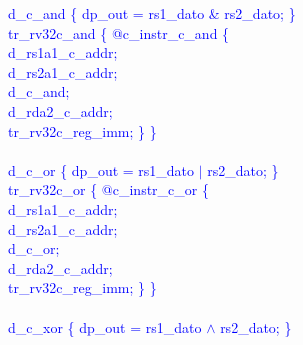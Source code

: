 \textcolor{blue}{
\indent d\_c\_and \{ dp\_out = rs1\_dato \& rs2\_dato; \}\\%
\indent tr\_rv32c\_and \{ @c\_instr\_c\_and \{ \\%
\indent \hspace{\parindent} d\_rs1a1\_c\_addr; \\%
\indent \hspace{\parindent} d\_rs2a1\_c\_addr; \\%
\indent \hspace{\parindent} d\_c\_and; \\%
\indent \hspace{\parindent} d\_rda2\_c\_addr;\\%
\indent \hspace{\parindent} tr\_rv32c\_reg\_imm; \} \} \\%
\\
\indent d\_c\_or \{ dp\_out = rs1\_dato $\vert$ rs2\_dato; \}\\%
\indent tr\_rv32c\_or \{ @c\_instr\_c\_or \{ \\%
\indent \hspace{\parindent} d\_rs1a1\_c\_addr; \\%
\indent \hspace{\parindent} d\_rs2a1\_c\_addr; \\%
\indent \hspace{\parindent} d\_c\_or; \\%
\indent \hspace{\parindent} d\_rda2\_c\_addr;\\%
\indent \hspace{\parindent} tr\_rv32c\_reg\_imm; \} \} \\%
\\
\indent d\_c\_xor \{ dp\_out = rs1\_dato $\wedge$ rs2\_dato; \}\\%
}

